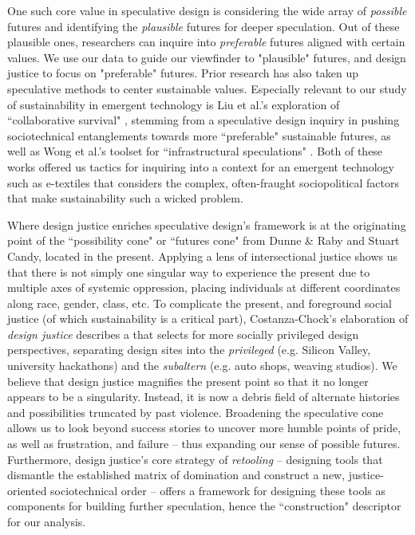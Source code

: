 One such core value in speculative design is considering the wide array of \textit{possible} futures and identifying the \textit{plausible} futures for deeper speculation. Out of these plausible ones, researchers can inquire into \textit{preferable} futures aligned with certain values. We use our data to guide our viewfinder to "plausible" futures, and design justice to focus on "preferable" futures.
Prior research has also taken up speculative methods to center sustainable values. Especially relevant to our study of sustainability in emergent technology is Liu et al.'s exploration of ``collaborative survival" \cite{liu_design_2018}, stemming from a speculative design inquiry in pushing sociotechnical entanglements towards more ``preferable" sustainable futures, as well as Wong et al.'s toolset for ``infrastructural speculations" \cite{wong_infrastructural_2020}. Both of these works offered us tactics for inquiring into a context for an emergent technology such as e-textiles that considers the complex, often-fraught sociopolitical factors that make sustainability such a wicked problem. 

Where design justice enriches speculative design's framework is at the originating point of %
the ``possibility cone" or ``futures cone" from Dunne \& Raby and Stuart Candy, located in the present. Applying a lens of intersectional justice shows us that there is not simply one singular way to experience the present due to multiple axes of systemic oppression, placing individuals at different coordinates along race, gender, class, etc. To complicate the present, and foreground social justice (of which sustainability is a critical part), Costanza-Chock's elaboration of \textit{design justice} \cite{costanza-chock_design_2020} describes a  that selects for more socially privileged design perspectives, separating design sites into the \textit{privileged} (e.g. Silicon Valley, university hackathons) and the \textit{subaltern} (e.g. auto shops, weaving studios). We believe that design justice magnifies the present point so that it no longer appears to be a singularity. Instead, it is now a debris field of alternate histories and possibilities truncated by past violence.
Broadening the speculative cone allows us to look beyond success stories to uncover more humble points of pride, as well as frustration, and failure -- thus expanding our sense of possible futures. Furthermore, design justice's core strategy of \textit{retooling} -- designing tools that dismantle the established matrix of domination and construct a new, justice-oriented sociotechnical order -- offers a framework for designing these tools as components for building further speculation, hence the ``construction" descriptor for our analysis.



